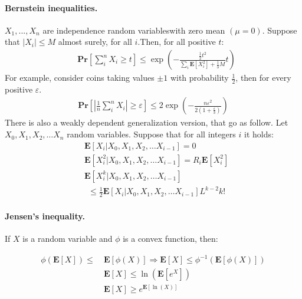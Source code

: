 \documentclass{article}
\newcommand{\prb}[1]{ \mathbf{Pr} \left[ {#1} \right]}
\newcommand{\expp}[1]{ \mathbf{E} \left[ {#1} \right]}
\newcommand{\indpr}{$ X_1, ..., X_n$ are independence random variables}
\begin{document}
\begin{multicols*}{2}
  \paragraph{Bernstein inequalities.} \indpr with zero mean $\left( \mu = 0  \right)$. Suppose that $|X_{i}| \le M $ almost surely, for all $i$.Then, for all positive $t$:
  \begin{equation*}
    \begin{split}
      & \prb{ \sum^{n}_{i}{X_i} \ge t  } \le \exp\left( -\frac{\frac{1}{2}t^{2}}{\sum_{i}{\expp{X_{i}^{2}}} + \frac{1}{3}M}t \right)
    \end{split}
  \end{equation*} For example, consider coins taking values $\pm 1$ with probability $\frac{1}{2}$, then for every positive $\varepsilon$. 
  \begin{equation*}
    \begin{split}
      \prb{ | \frac{1}{n}\sum_{i}^{n}{X_i} | \ge \varepsilon  } \le 2\exp\left( -\frac{n\varepsilon^{2}}{2\left( 1+\frac{\varepsilon}{3} \right)} \right) 
    \end{split}
  \end{equation*}
  There is also a weakly dependent generalization version, that go as follow. Let $X_{0},X_{1},X_{2},\ldots X_{n}$ random variables. Suppose that for all integers $i$ it holds:  
  \begin{equation*}
    \begin{split}
      &\expp{X_{i}|X_{0},X_{1},X_{2},\ldots X_{i-1}}=0\\
      & \expp{X_{i}^{2}|X_{0},X_{1},X_{2},\ldots X_{i-1}}= R_{i}\expp{X_{i}^{2}}\\
    & \expp{X_{i}^{k} | X_{0},X_{1},X_{2},\ldots X_{i-1}}  \\
    & \ \ \le \frac{1}{2}\expp{X_{i}|X_{0},X_{1},X_{2},\ldots X_{i-1}} L^{k-2}k! 
      \end{split}
    \end{equation*}
    \paragraph{Jensen's inequality.} If $X$ is a random variable and $\phi$ is a convex function, then:

    \begin{equation*}
      \begin{split}
	\phi\left( \expp{X} \right) \le \ & \expp{\phi\left( X \right)} \Rightarrow   \expp{X} \le \phi^{-1} \left( \expp{\phi\left( X \right)} \right) \\
	& \expp{X} \le \ln\left(\expp{e^{X}}  \right)  \\ 
	&  \expp{X} \ge e^{\expp{\ln \left( X \right)}}  
      \end{split}
    \end{equation*}

\end{multicols*}
\end{document}
